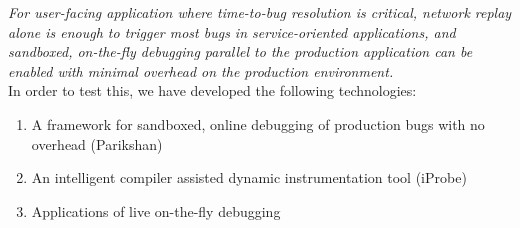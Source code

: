 \emph{For user-facing application where time-to-bug resolution is critical, network replay alone is enough to trigger most bugs in service-oriented applications, and sandboxed, on-the-fly debugging parallel to the production application can be enabled with minimal overhead on the production environment.}\\


In order to test this, we have developed the following technologies:
\begin{enumerate}
	\setlength{\itemsep}{0pt}
	\item A framework for sandboxed, online debugging of production bugs with no overhead (Parikshan)
	\item An intelligent compiler assisted dynamic instrumentation tool (iProbe)
	\item Applications of live on-the-fly debugging
\end{enumerate}



